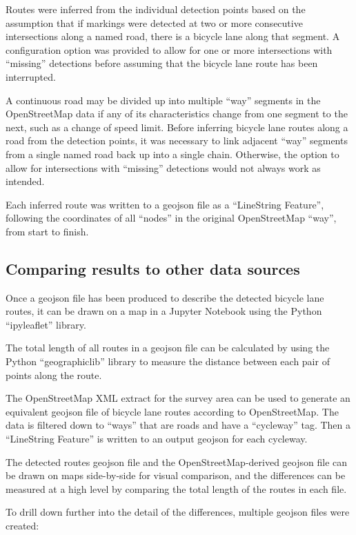 \documentclass[11pt,twoside]{report}
\begin{document}
Routes were inferred from the individual detection points based on the assumption that if markings were detected at two or more consecutive intersections along a named road, there is a bicycle lane along that segment.  A configuration option was provided to allow for one or more intersections with ``missing'' detections before assuming that the bicycle lane route has been interrupted.

A continuous road may be divided up into multiple ``way'' segments in the OpenStreetMap data if any of its characteristics change from one segment to the next, such as a change of speed limit.  Before inferring bicycle lane routes along a road from the detection points, it was necessary to link adjacent ``way'' segments from a single named road back up into a single chain.  Otherwise, the option to allow for intersections with ``missing'' detections would not always work as intended.

Each inferred route was written to a geojson file as a ``LineString Feature'', following the coordinates of all ``nodes'' in the original OpenStreetMap ``way'', from start to finish.


\subsection{Comparing results to other data sources}

Once a geojson file has been produced to describe the detected bicycle lane routes, it can be drawn on a map in a Jupyter Notebook using the Python ``ipyleaflet'' library.

The total length of all routes in a geojson file can be calculated by using the Python ``geographiclib'' library to measure the distance between each pair of points along the route.

The OpenStreetMap XML extract for the survey area can be used to generate an equivalent geojson file of bicycle lane routes according to OpenStreetMap.  The data is filtered down to ``ways'' that are roads and have a ``cycleway'' tag.  Then a ``LineString Feature'' is written to an output geojson for each cycleway.

The detected routes geojson file and the OpenStreetMap-derived geojson file can be drawn on maps side-by-side for visual comparison, and the differences can be measured at a high level by comparing the total length of the routes in each file.

To drill down further into the detail of the differences, multiple geojson files were created:
\end{document}

